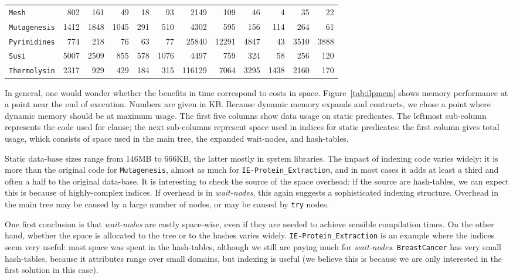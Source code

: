 \documentclass{llncs}
\begin{document}
\begin{table*}[ht]
\begin {tabular}{|l|r|r|r|r|r||r|r|r|r|r|r|}
    \texttt{Mesh}              & 802 & 161
    &49 & 18 & 93 & 2149 & 109
    & 46 & 4 & 35 & 22
 \\

    \texttt{Mutagenesis}       & 1412 & 1848
    &1045 & 291 & 510 & 4302 & 595
    & 156 & 114 & 264 & 61
 \\

    \texttt{Pyrimidines}       & 774 & 218
    &76 & 63 & 77 & 25840 & 12291
    & 4847 & 43 & 3510 & 3888
 \\

    \texttt{Susi}              & 5007 & 2509
    &855 & 578 & 1076 & 4497 & 759
    & 324 & 58 & 256 & 120
 \\

    \texttt{Thermolysin}       & 2317 & 929
    &429 & 184 & 315 & 116129 & 7064
    & 3295 & 1438 & 2160 & 170
 \\

    \hline
\end{tabular}
\caption{Memory Performance on Machine Learning (ILP) Datasets}
\label{tab:ilpmem}
\end{table*}


In general, one would wonder whether the benefits in time correspond
to costs in space. Figure~\ref{tab:ilpmem} shows memory performance at
a point near the end of execution. Numbers are given in KB. Because
dynamic memory expands and contracts, we chose a point where dynamic
memory should be at maximum usage. The first five columns show data
usage on static predicates.  The leftmost sub-column represents the
code used for clause; the next sub-columns represent space used in
indices for static predicates: the first column gives total usage,
which consists of space used in the main tree, the expanded
wait-nodes, and hash-tables.

Static data-base sizes range from 146MB to 666KB, the latter mostly in
system libraries. The impact of indexing code varies widely: it is
more than the original code for \texttt{Mutagenesis}, almost as much
for \texttt{IE-Protein\_Extraction}, and in most cases it adds at
least a third and often a half to the original data-base. It is
interesting to check the source of the space overhead: if the source
are hash-tables, we can expect this is because of highly-complex
indices. If overhead is in \emph{wait-nodes}, this again suggests a
sophisticated indexing structure. Overhead in the main tree may be
caused by a large number of nodes, or may be caused by \texttt{try}
nodes.

One first conclusion is that \emph{wait-nodes} are costly space-wise,
even if they are needed to achieve sensible compilation times.  On the
other hand, whether the space is allocated to the tree or to the
hashes varies widely. \texttt{IE-Protein\_Extraction} is an example
where the indices seem very useful: most space was spent in the
hash-tables, although we still are paying much for \emph{wait-nodes}.
\texttt{BreastCancer} has very small hash-tables, because it
attributes range over small domains, but indexing is useful (we
believe this is because we are only interested in the first solution
in this case).
\end{document}
